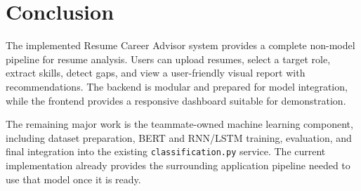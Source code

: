 \documentclass[12pt,a4paper]{article}
\begin{document}
\section{Conclusion}

The implemented Resume Career Advisor system provides a complete non-model pipeline for resume analysis. Users can upload resumes, select a target role, extract skills, detect gaps, and view a user-friendly visual report with recommendations. The backend is modular and prepared for model integration, while the frontend provides a responsive dashboard suitable for demonstration.

The remaining major work is the teammate-owned machine learning component, including dataset preparation, BERT and RNN/LSTM training, evaluation, and final integration into the existing \texttt{classification.py} service. The current implementation already provides the surrounding application pipeline needed to use that model once it is ready.
\end{document}
